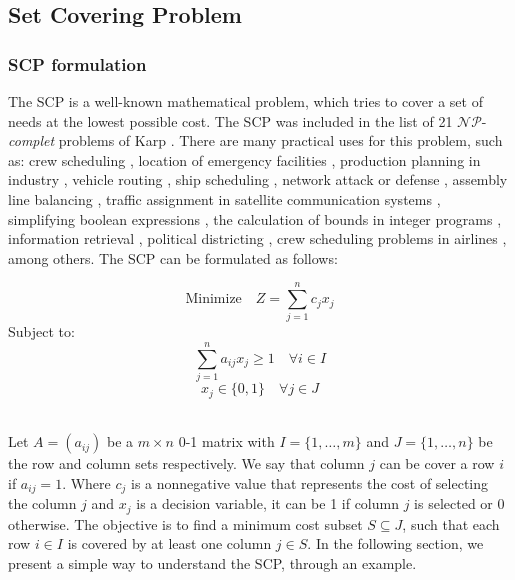 \subsection{Set Covering Problem}
\subsubsection{SCP formulation}
The SCP is a well-known mathematical problem, which tries to cover a set of needs at the lowest possible cost. The SCP was included in the list of 21  $\mathcal{N} \mathcal{P}$-\textit{complet} problems of Karp \cite{DBLP:books/daglib/p/Karp10}. There are many practical uses for this problem, such as: crew scheduling \cite{ref02, ref08}, location of emergency facilities \cite{ref51,Vasko198485}, production planning in industry \cite{Vasko:1987:OSI:40299.40301,ref48, ref50}, vehicle routing \cite{ref07, ref27}, ship scheduling \cite{ref26, ref13}, network attack or defense \cite{ref14}, assembly line balancing \cite{ref28, ref41}, traffic assignment in satellite communication systems \cite{ref37, ceriaetal1998}, simplifying boolean expressions \cite{ref16}, the calculation of bounds in integer programs \cite{ref18}, information retrieval \cite{ref20}, political districting \cite{ref29}, crew scheduling problems in airlines \cite{doi:10.1287/inte.27.5.68}, among others.
The SCP can be formulated as follows:

\begin{equation} \label{ec:set-covering-1}  
\mbox{Minimize} \quad Z = \sum_{j = 1}^{n} c_j x_j
\end{equation}
Subject to:
\begin{equation} \label{ec:set-covering-2} 
\sum_{j = 1}^{n} a_{ij} x_j \geq 1 \quad  \forall i \in I
\end{equation}
\begin{equation} \label{ec:set-covering-3} 
x_j \in \{0,1\} \quad  \forall j \in J 
\end{equation}	

~\\
Let $A = (a_{ij})$ be a $m \times n$ 0-1 matrix with $I = \{ 1,\dots, m\}$ and $J = \{ 1,\dots, n\}$ be the row and column sets respectively. We say that column $j$ can be cover a row $i$ if $a_{ij} = 1$. Where $c_j$ is a nonnegative value that represents the cost of selecting the column $j$ and $x_j$ is a decision variable, it can be 1 if column $j$ is selected or 0 otherwise. The objective is to find a minimum cost subset $S \subseteq J$, such that each row $i \in I$ is covered by at least one column $j \in S$. In the following section, we present a simple way to understand the SCP, through an example.

